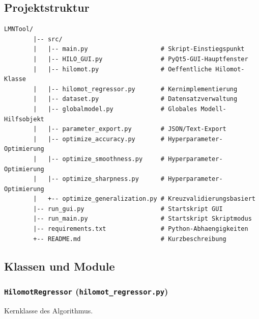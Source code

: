 \documentclass[11pt,a4paper]{report}
\begin{document}
	\subsection{Projektstruktur}
	
	\begin{lstlisting}[caption={Verzeichnisstruktur des LMNTool-Projekts},language={}
		]
		LMNTool/
		|-- src/
		|   |-- main.py                    # Skript-Einstiegspunkt
		|   |-- HILO_GUI.py                # PyQt5-GUI-Hauptfenster
		|   |-- hilomot.py                 # Oeffentliche Hilomot-Klasse
		|   |-- hilomot_regressor.py       # Kernimplementierung
		|   |-- dataset.py                 # Datensatzverwaltung
		|   |-- globalmodel.py             # Globales Modell-Hilfsobjekt
		|   |-- parameter_export.py        # JSON/Text-Export
		|   |-- optimize_accuracy.py       # Hyperparameter-Optimierung
		|   |-- optimize_smoothness.py     # Hyperparameter-Optimierung
		|   |-- optimize_sharpness.py      # Hyperparameter-Optimierung
		|   +-- optimize_generalization.py # Kreuzvalidierungsbasiert
		|-- run_gui.py                     # Startskript GUI
		|-- run_main.py                    # Startskript Skriptmodus
		|-- requirements.txt               # Python-Abhaengigkeiten
		+-- README.md                      # Kurzbeschreibung
	\end{lstlisting}
	
	\subsection{Klassen und Module}
	
	\subsubsection*{\texttt{HilomotRegressor} (\texttt{hilomot\_regressor.py})}
	
	Kernklasse des Algorithmus.
	
\end{document}
